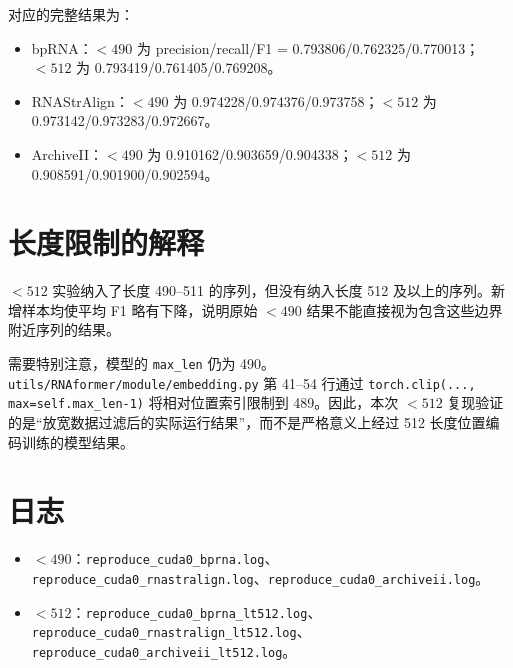 \documentclass[UTF8,a4paper,11pt]{ctexart}
\begin{document}
对应的完整结果为：

\begin{itemize}
  \item bpRNA：$<490$ 为 precision/recall/F1 = 0.793806/0.762325/0.770013；$<512$ 为 0.793419/0.761405/0.769208。
  \item RNAStrAlign：$<490$ 为 0.974228/0.974376/0.973758；$<512$ 为 0.973142/0.973283/0.972667。
  \item ArchiveII：$<490$ 为 0.910162/0.903659/0.904338；$<512$ 为 0.908591/0.901900/0.902594。
\end{itemize}

\section{长度限制的解释}

$<512$ 实验纳入了长度 490--511 的序列，但没有纳入长度 512 及以上的序列。新增样本均使平均 F1 略有下降，说明原始 $<490$ 结果不能直接视为包含这些边界附近序列的结果。

需要特别注意，模型的 \texttt{max\_len} 仍为 490。\texttt{utils/RNAformer/module/embedding.py} 第 41--54 行通过
\texttt{torch.clip(..., max=self.max\_len-1)} 将相对位置索引限制到 489。因此，本次 $<512$ 复现验证的是“放宽数据过滤后的实际运行结果”，而不是严格意义上经过 512 长度位置编码训练的模型结果。

\section{日志}

\begin{itemize}
  \item $<490$：\texttt{reproduce\_cuda0\_bprna.log}、\texttt{reproduce\_cuda0\_rnastralign.log}、\texttt{reproduce\_cuda0\_archiveii.log}。
  \item $<512$：\texttt{reproduce\_cuda0\_bprna\_lt512.log}、\texttt{reproduce\_cuda0\_rnastralign\_lt512.log}、\texttt{reproduce\_cuda0\_archiveii\_lt512.log}。
\end{itemize}
\end{document}
